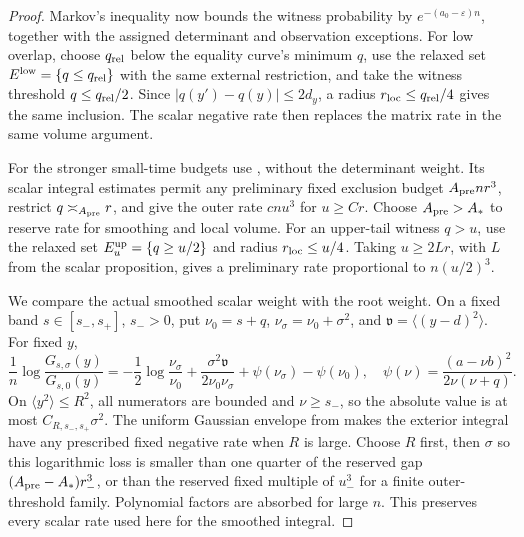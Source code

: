 \begin{proof}
Markov's inequality now bounds the witness probability by
\(e^{-(a_0-\varepsilon)n}\), together with the assigned determinant
and observation exceptions. For low overlap, choose
\(q_{\rm rel}\) below the equality curve's minimum \(q\), use
the relaxed set \(E^{\rm low}=\{q\le q_{\rm rel}\}\) with the
same external restriction, and take
the witness threshold \(q\le q_{\rm rel}/2\).
Since \(|q(y')-q(y)|\le2d_y\), a radius
\(r_{\rm loc}\le q_{\rm rel}/4\) gives the same inclusion.
The scalar negative rate then replaces the matrix rate in the
same volume argument.

For the stronger small-time budgets use
, without the determinant weight.
Its scalar integral estimates permit any preliminary fixed
exclusion budget \(A_{\rm pre}nr^3\), restrict
$q\asymp_{A_{\rm pre}}r$, and give the outer rate $cnu^3$ for $u\ge Cr$.
Choose \(A_{\rm pre}>A_*\) to reserve rate for smoothing and
local volume. For an upper-tail witness \(q>u\), use the relaxed
set \(E_u^{\rm up}=\{q\ge u/2\}\) and radius
\(r_{\rm loc}\le u/4\). Taking \(u\ge2Lr\), with \(L\) from
the scalar proposition, gives a preliminary rate proportional to
\(n(u/2)^3\).

We compare the actual smoothed scalar weight with the root weight.
On a fixed band \(s\in[s_-,s_+]\), \(s_->0\), put
\(\nu_0=s+q\), \(\nu_\sigma=\nu_0+\sigma^2\), and
\(\mathfrak v=\langle(y-d)^2\rangle\). For fixed \(y\),
\[
 \frac1n\log\frac{G_{s,\sigma}(y)}{G_{s,0}(y)}
 =-\frac12\log\frac{\nu_\sigma}{\nu_0}
 +\frac{\sigma^2\mathfrak v}{2\nu_0\nu_\sigma}
 +\psi(\nu_\sigma)-\psi(\nu_0),
 \quad
 \psi(\nu)=\frac{(a-\nu b)^2}{2\nu(\nu+q)}.
\]
On \(\langle y^2\rangle\le R^2\), all numerators are bounded
and \(\nu\ge s_-\), so the absolute value is at most
\(C_{R,s_-,s_+}\sigma^2\). The uniform Gaussian envelope from
 makes the exterior integral have any
prescribed fixed negative rate when \(R\) is large.
Choose \(R\) first, then \(\sigma\) so this logarithmic loss is
smaller than one quarter of the reserved gap
\((A_{\rm pre}-A_*)r_-^3\), or than the reserved fixed multiple
of \(u_-^3\) for a finite outer-threshold family. Polynomial
factors are absorbed for large \(n\). This preserves every scalar
rate used here for the smoothed integral.


\end{proof}
